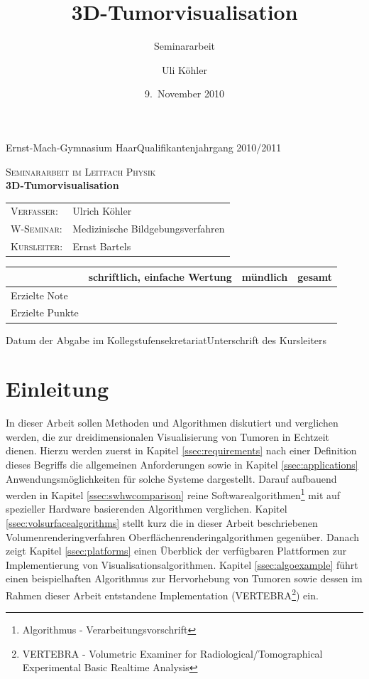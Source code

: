 \documentclass[pdftex,a4paper,titlepage,12pt]{scrartcl}
\title{3D-Tumorvisualisation}
\subtitle{Seminararbeit}
\author{Uli Köhler}
\date{9.~November 2010}
\newtheorem[L]{boxedDefinition}{Definition}
\begin{document}
\begin{titlepage}
 Ernst-Mach-Gymnasium Haar\hfill Qualifikantenjahrgang 2010/2011
\vspace{4cm}
\begin{center}
  
 \large\textsc{Seminararbeit im Leitfach Physik}\\[2cm]
 {\fontsize{40}{40}\selectfont \textbf{3D-Tumorvisualisation}}\\[2cm]

 \begin{tabular}{ll}
  \textsc{Verfasser:} & Ulrich Köhler\\
  \textsc{W-Seminar:} & Medizinische Bildgebungsverfahren\\
  \textsc{Kursleiter:} & Ernst Bartels\\[2cm]
 \end{tabular}
\vspace{2cm}

\begin{tabular}[c]{|l|s{38mm}|s{38mm}|s{38mm}|}\hline
& schriftlich, einfache Wertung &\scriptsize mündlich &\scriptsize gesamt\\\hline
Erzielte Note & & &\\\hline
Erzielte Punkte & & &\\\hline
\end{tabular}
\vspace{3cm}

\end{center}

Datum der Abgabe im Kollegstufensekretariat\hfill Unterschrift des Kursleiters
\thispagestyle{empty}

\end{titlepage}


\thispagestyle{empty}\newpage
\tableofcontents\thispagestyle{empty}\newpage
\section{Einleitung}\label{sec:introduction}
In dieser Arbeit sollen Methoden und Algorithmen diskutiert und verglichen werden, die zur dreidimensionalen Visualisierung von Tumoren in Echtzeit dienen. Hierzu werden zuerst in Kapitel \vref{ssec:requirements} nach einer Definition dieses Begriffs die allgemeinen Anforderungen sowie in Kapitel \vref{ssec:applications} Anwendungsmöglichkeiten für solche Systeme dargestellt. Darauf aufbauend werden in Kapitel \vref{ssec:swhwcomparison} reine Softwarealgorithmen\footnote{Algorithmus - Verarbeitungsvorschrift} mit auf spezieller Hardware basierenden Algorithmen verglichen. Kapitel \vref{ssec:volsurfacealgorithms} stellt kurz die in dieser Arbeit beschriebenen Volumenrenderingverfahren Oberflächenrenderingalgorithmen gegenüber. Danach zeigt Kapitel \vref{ssec:platforms} einen Überblick der verfügbaren Plattformen zur Implementierung von Visualisationsalgorithmen. Kapitel \vref{ssec:algoexample} führt einen beispielhaften Algorithmus zur Hervorhebung von Tumoren sowie dessen im Rahmen dieser Arbeit entstandene Implementation (\glqq VERTEBRA\footnote{VERTEBRA - Volumetric Examiner for Radiological/Tomographical Experimental Basic Realtime Analysis}\grqq) ein.
\end{document}
